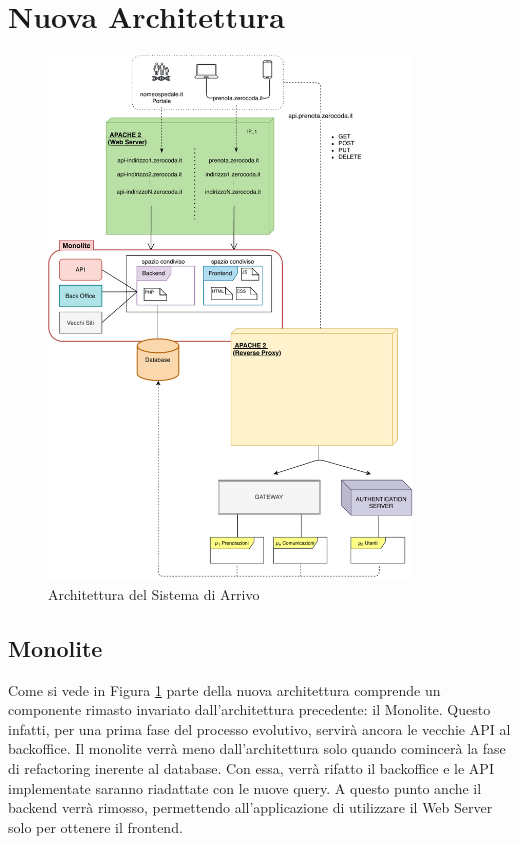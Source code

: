 \section{Nuova Architettura}
\begin{figure}[H]
    \centering
    \includegraphics[width=0.86\textwidth]{images/02_6_new_architecture.pdf}
    \caption{Architettura del Sistema di Arrivo}
    \label{fig:newarchitecture}
\end{figure}

\subsection{Monolite}
Come si vede in Figura \ref{fig:newarchitecture} parte della nuova architettura comprende un componente rimasto invariato dall'architettura precedente: il Monolite. Questo infatti, per una prima fase del processo evolutivo, servirà ancora le vecchie API al backoffice. Il monolite verrà meno dall'architettura solo quando comincerà la fase di refactoring inerente al database. Con essa, verrà rifatto il backoffice e le API implementate saranno riadattate con le nuove query. A questo punto anche il backend verrà rimosso, permettendo all'applicazione di utilizzare il Web Server solo per ottenere il frontend.

